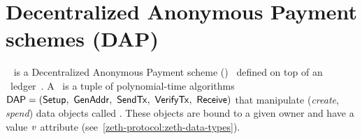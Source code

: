 
\section{Decentralized Anonymous Payment schemes (DAP)}\label{preliminaries:dap}

\zeth~\cite{zethpaper} is a Decentralized Anonymous Payment scheme (\dapscheme)~\cite[Section 3]{sasson2014zerocash} defined on top of an \ethereum~ledger~\ledger. A \dapscheme~is a tuple of polynomial-time algorithms $\dapscheme = (\setup,\ \genadd,\ \sendtx,\ \verifytx,\ \receive)$ that manipulate (\emph{create}, \emph{spend}) data objects called \notes. These objects are bound to a given owner and have a value $\mathit{v}$ attribute (see~\cref{zeth-protocol:zeth-data-types}).

